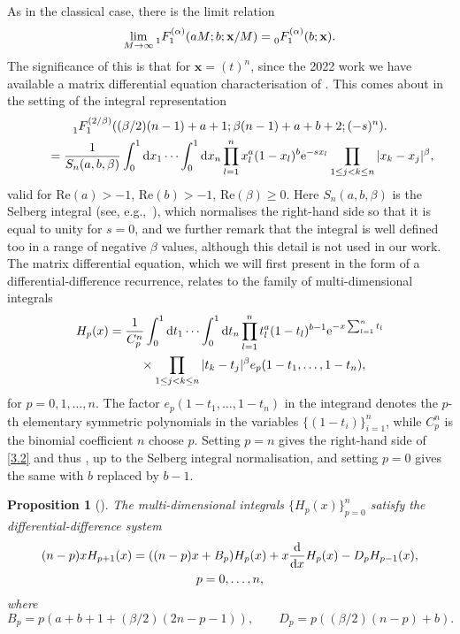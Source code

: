\documentclass[pdftex]{sigma}
\numberwithin{equation}{section}
\newtheorem{Proposition}[Theorem]{Proposition}
\theoremstyle{definition}
\begin{document}
As in the classical case, there is the limit relation
\begin{equation}\label{2.8b}
\lim_{M \to \infty}
{\vphantom{F}}_1^{\mathstrut} F_1^{(\alpha)}(a M;b;\mathbf x/M) =
{\vphantom{F}}_0^{\mathstrut} F_1^{(\alpha)}(b;\mathbf x).
\end{equation}
The significance of this is that for $\mathbf x = (t)^n$, since the 2022 work
\cite{FK22} we have available a matrix differential equation characterisation of
.
This comes about in the setting of the integral representation \cite[Corollary~2.1]{Fo10}
\begin{gather}
 {\vphantom{F}}_1^{\mathstrut} F_1^{(2/\beta)} ( (\beta/2) (n-1) + a + 1 ; \beta (n - 1) + a + b + 2 ;(-s)^n ).\nonumber\\
\qquad={1 \over S_n(a,b,\beta)} \int_0^1 {\rm d}x_1 \cdots \int_0^1 {\rm d}x_n
\prod_{l=1}^n x_l^{a} (1 - x_l)^{b} {\rm e}^{-s x_l} \prod_{1 \le j < k \le n} | x_k - x_j |^\beta,\label{3.2}
\end{gather}
valid for Re$(a) > -1$, Re$(b) > -1$, {Re$(\beta) \ge 0$}. Here $S_n(a,b,\beta)$ is the Selberg integral (see, e.g.,~\cite[Chapter~4]{Fo10}), which normalises the right-hand side so that it is equal to unity for $s=0$, and we further remark that the integral is well defined too in a range of negative $\beta$ values, although this detail is not used in our work. The matrix differential equation, which we will first present in the form of a differential-difference recurrence, relates to the family of multi-dimensional integrals
\begin{gather*}%
H_{p}(x) = {1 \over C_p^n}\int_0^1 {\rm d}t_1 \cdots \int_0^1 {\rm d}t_n
\prod_{l=1}^n t_l^{a} (1 - t_l)^{b-1} {\rm e}^{-x \sum_{l=1}^n t_l} \\
\phantom{H_{p}(x) = }{}\times \prod_{1 \le j < k \le n} | t_k - t_j|^\beta
e_p(1 - t_1,\dots, 1 - t_n),
\end{gather*}
for $p=0,1,\dots,n$.
The factor $e_p(1 - t_1,\dots, 1 - t_n)$ in the integrand denotes the $p$-th elementary symmetric polynomials in the variables $\{ (1 - t_i) \}_{i=1}^n$, while
$C_p^n$ is the binomial coefficient $n$ choose $p$. Setting $p=n$ gives the right-hand side of
\eqref{3.2} and thus , up to the Selberg integral normalisation, and setting $p=0$ gives the same with $b$ replaced by $b-1$.

\begin{Proposition}[{\cite[Corollary~2.5]{FK22}}] \label{P3.1}
The multi-dimensional integrals $\{ H_p(x) \}_{p=0}^{n}$ satisfy the
differential-difference system
\begin{gather}
(n - p) x H_{p+1}(x)
= ( (n - p) x + B_p ) H_p(x) + x {{\rm d} \over {\rm d}x} H_p(x) - D_p H_{p-1}(x), \nonumber\\
 p=0,\dots, n,\label{6.1a}
\end{gather}
where
\[
B_p = p ( a + b + 1 + (\beta/2)(2n - p - 1) ), \qquad
D_p = p ( (\beta/2) (n - p) + b ).
\]
\end{Proposition}
\end{document}
